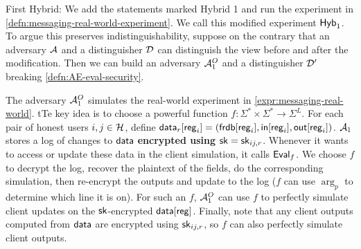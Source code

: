 


First Hybrid: We add the statements marked Hybrid 1 and run the experiment in \cref{defn:messaging-real-world-experiment}. We call this modified experiment $\mathsf{Hyb}_1$. To argue this preserves indistinguishability, suppose on the contrary that an adversary $\mathcal{A}$ and a distinguisher $\mathcal{D}$ can distinguish the view before and after the modification. Then we can build an adversary $\mathcal{A}_1^O$ and a distinguisher $\mathcal{D}'$ breaking \cref{defn:AE-eval-security}. 

The adversary $\mathcal{A}_1^O$ simulates the real-world experiment in \cref{expr:messaging-real-world}. tTe key idea is to choose a powerful function $f: \Sigma^* \times \Sigma^* \to \Sigma^L$. For each pair of honest users $i, j \in \mathcal{H}$, define $\mathsf{data}_r[\mathsf{reg}_i] = (\mathsf{frdb}[\mathsf{reg}_i], \mathsf{in}[\mathsf{reg}_i], \mathsf{out}[\mathsf{reg}_i])$. $\mathcal{A}_1$ stores a log of changes to $\mathsf{data}$ \textbf{encrypted using ${\mathsf{sk}} = {\mathsf{sk}}_{ij, r}$}. Whenever it wants to access or update these data in the client simulation, it calls $\mathsf{Eval}_f$. We choose $f$ to decrypt the log, recover the plaintext of the fields, do the corresponding simulation, then re-encrypt the outputs and update to the log ($f$ can use $\arg_p$ to determine which line it is on). For such an $f$, $\mathcal{A}_1^O$ can use $f$ to perfectly simulate client updates on the ${\mathsf{sk}}$-encrypted $\mathsf{data}[\mathsf{reg}]$. Finally, note that any client outputs computed from $\mathsf{data}$ are encrypted using ${\mathsf{sk}}_{ij, r}$, so $f$ can also perfectly simulate client outputs. 

